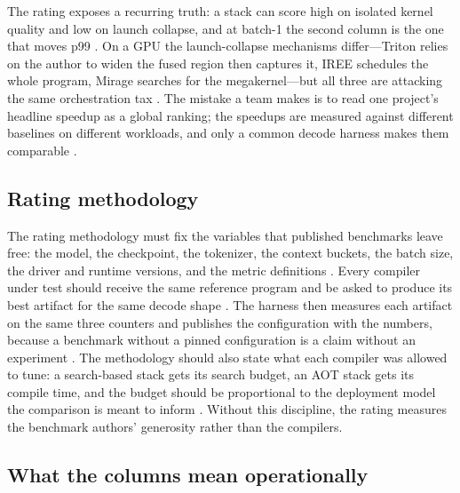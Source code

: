 The rating exposes a recurring truth: a stack can score high on isolated kernel quality and low on launch collapse, and at batch-1 the second column is the one that moves p99 \citep{taxbreak2026,nvidia2024cudagraphs}. On a GPU the launch-collapse mechanisms differ---Triton relies on the author to widen the fused region then captures it, IREE schedules the whole program, Mirage searches for the megakernel---but all three are attacking the same orchestration tax \citep{memoryfloor2026,mpk2025}. The mistake a team makes is to read one project's headline speedup as a global ranking; the speedups are measured against different baselines on different workloads, and only a common decode harness makes them comparable \citep{patel2025llminference,dlbook}.

\subsection{Rating methodology}

The rating methodology must fix the variables that published benchmarks leave free: the model, the checkpoint, the tokenizer, the context buckets, the batch size, the driver and runtime versions, and the metric definitions \citep{patel2025llminference,taxbreak2026,memoryfloor2026}. Every compiler under test should receive the same reference program and be asked to produce its best artifact for the same decode shape \citep{chen2020compilerbasedhardw,patel2025llminference}. The harness then measures each artifact on the same three counters and publishes the configuration with the numbers, because a benchmark without a pinned configuration is a claim without an experiment \citep{memoryfloor2026,taxbreak2026}. The methodology should also state what each compiler was allowed to tune: a search-based stack gets its search budget, an AOT stack gets its compile time, and the budget should be proportional to the deployment model the comparison is meant to inform \citep{wu2024mirage,zheng2020ansor}. Without this discipline, the rating measures the benchmark authors' generosity rather than the compilers.

\subsection{What the columns mean operationally}

